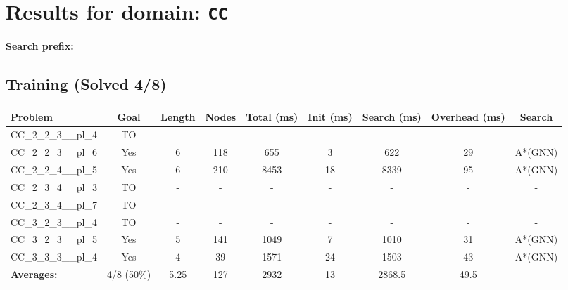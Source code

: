 \documentclass{article}
\begin{document}
\section*{Results for domain: \texttt{CC}}
\textbf{Search prefix:} 
\\[0.5cm]
\subsection*{Training (Solved 4/8)}
\begin{tabular}{lcccccccc}
\toprule
Problem & Goal & Length & Nodes & Total (ms) & Init (ms) & Search (ms) & Overhead (ms) & Search \\
\midrule
CC\_2\_2\_3\_\_pl\_4 & TO & - & - & - & - & - & - & - \\
CC\_2\_2\_3\_\_pl\_6 & Yes & 6 & 118 & 655 & 3 & 622 & 29 & A*(GNN) \\
CC\_2\_2\_4\_\_pl\_5 & Yes & 6 & 210 & 8453 & 18 & 8339 & 95 & A*(GNN) \\
CC\_2\_3\_4\_\_pl\_3 & TO & - & - & - & - & - & - & - \\
CC\_2\_3\_4\_\_pl\_7 & TO & - & - & - & - & - & - & - \\
CC\_3\_2\_3\_\_pl\_4 & TO & - & - & - & - & - & - & - \\
CC\_3\_2\_3\_\_pl\_5 & Yes & 5 & 141 & 1049 & 7 & 1010 & 31 & A*(GNN) \\
CC\_3\_3\_3\_\_pl\_4 & Yes & 4 & 39 & 1571 & 24 & 1503 & 43 & A*(GNN) \\
\textbf{Averages:} & 4/8 (50\%) & 5.25 & 127 & 2932 & 13 & 2868.5 & 49.5 & \\
\bottomrule
\end{tabular}
\\[0.7cm]
\end{document}
